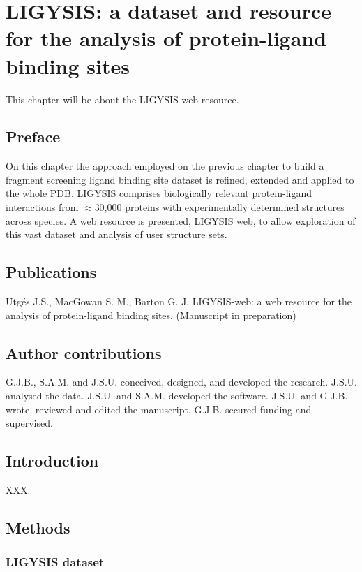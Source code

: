 \chapter{LIGYSIS: a dataset and resource for the analysis of protein-ligand binding sites}

This chapter will be about the LIGYSIS-web resource.

\section*{Preface}

On this chapter the approach employed on the previous chapter to build a fragment screening ligand binding site dataset is refined, extended and applied to the whole PDB. LIGYSIS comprises biologically relevant protein-ligand interactions from $\approx$30,000 proteins with experimentally determined structures across species. A web resource is presented, LIGYSIS web, to allow exploration of this vast dataset and analysis of user structure sets.

\section*{Publications}

Utgés J.S., MacGowan S. M., Barton G. J. LIGYSIS-web: a web resource for the analysis of protein-ligand binding sites. (Manuscript in preparation)

\section*{Author contributions}

G.J.B., S.A.M. and J.S.U. conceived, designed, and developed the research. J.S.U. analysed the data. J.S.U. and S.A.M. developed the software. J.S.U. and G.J.B. wrote, reviewed and edited the manuscript. G.J.B. secured funding and supervised.

\section{Introduction}

XXX.

\section{Methods}

\subsection{LIGYSIS dataset}

